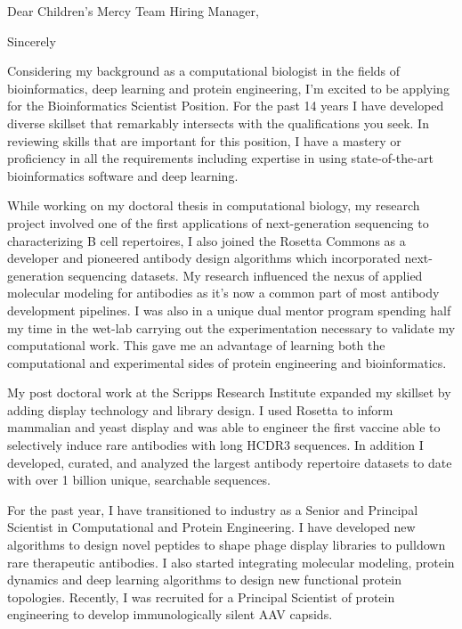 \documentclass[11pt,a4paper,sans]{moderncv}        %
\title{}                               %
\begin{document}
\date{2020}
\opening{Dear Children's Mercy Team Hiring Manager,}
\closing{Sincerely}
\makelettertitle


Considering my background as a computational biologist in the fields of bioinformatics, deep learning and protein engineering, I'm excited to be applying for the
Bioinformatics Scientist Position.
For the past 14 years I have developed diverse skillset that remarkably intersects with the qualifications you seek. In reviewing skills that are important for this position, I have a mastery or proficiency in all the requirements 
including expertise in using state-of-the-art bioinformatics software and deep learning.

While working on my doctoral thesis in computational biology, my research project involved one of the first applications of next-generation 
sequencing to characterizing B cell repertoires,
I also joined the Rosetta Commons as a developer and pioneered antibody design algorithms which incorporated next-generation sequencing datasets. My research influenced the nexus of applied molecular modeling for antibodies as it's now a common part of most antibody development pipelines. I was also in a unique dual 
mentor program spending half my time in the wet-lab carrying out the experimentation necessary to validate my computational work. This gave me an advantage 
of learning both the computational and experimental sides of protein engineering and bioinformatics.

My post doctoral work at the Scripps Research Institute expanded my skillset by adding display technology and library design. I used Rosetta to inform 
mammalian and yeast 
display and was able to engineer the first vaccine able to selectively induce rare antibodies with long HCDR3 sequences.  In addition I developed, curated, and analyzed the largest antibody 
repertoire datasets to date with over 1 billion unique, searchable sequences.

For the past year, I have transitioned to industry as a 
Senior and Principal Scientist in Computational and Protein Engineering. I have developed new algorithms to design novel peptides to shape phage display libraries to pulldown rare therapeutic antibodies.
I also started integrating molecular modeling, protein dynamics and deep learning algorithms to design new functional protein topologies. Recently, I was recruited for a Principal Scientist of protein engineering to develop immunologically silent AAV capsids. 
\end{document}
